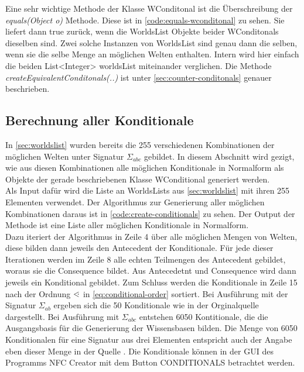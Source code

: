 \documentclass[12pt,a4paper]{article}
\newcommand\dotl{\mathrel{%
    \mathchoice{\QEQ}{\QEQ}{\QEQ}{\QEQ}%
}}
\def\QEQ{{%
    \setbox0\hbox{<}%
    \rlap{\hbox to \wd0{\hss \raisebox {0.1pt}{$\ \cdot$\hss}}}\box0
}}
\begin{document}
Eine sehr wichtige Methode der Klasse WConditonal ist die Überschreibung der \textit{equals(Object o)} Methode. Diese ist in \autoref{code:equals-wconditonal} zu sehen. Sie liefert dann true zurück, wenn die WorldsList Objekte beider WConditonals dieselben sind. Zwei solche Instanzen von WorldsList sind genau dann die selben, wenn sie die selbe Menge an möglichen Welten enthalten. Intern wird hier einfach die beiden List<Integer> worldsList miteinander verglichen. Die Methode \textit{createEquivalentConditonals(..)} ist unter \autoref{sec:counter-conditonals} genauer beschrieben.


\subsection{Berechnung aller Konditionale}




In \autoref{sec:worldslist} wurden bereits die 255 verschiedenen Kombinationen der möglichen Welten unter Signatur $\Sigma_{abc}$ gebildet. In diesem Abschnitt wird gezigt, wie aus diesen Kombinationen alle möglichen Konditionale in Normalform als Objekte der gerade beschriebenen Klasse WConditional generiert werden. \\
Als Input dafür wird die Liste an WorldsLists aus \autoref{sec:worldslist} mit ihren 255 Elementen verwendet. Der Algorithmus zur Generierung aller möglichen Kombinationen daraus ist in \autoref{code:create-conditionals} zu sehen. Der Output der Methode ist eine Liste aller möglichen Konditionale in Normalform. \\
Dazu iteriert der Algorithmus in Zeile 4 über alle möglichen Mengen von Welten, diese bilden dann jeweils den Antecedent der Konditionale. Für jede dieser Iterationen werden im Zeile 8 alle echten Teilmengen des Antecedent gebildet, woraus sie die Consequence bildet. Aus Antecedetnt und Consequence wird dann jeweils ein Konditional gebildet. Zum Schluss werden die Konditionale in Zeile 15 nach der Ordnung $\dotl$ in \autoref{eq:conditional-order} sortiert. Bei Ausführung mit der Signatur $\Sigma_{ab}$ ergeben sich die 50 Konditionale wie in der Orginalquelle \cite{beierle19} dargestellt. Bei Ausführung mit $\Sigma_{abc}$ entstehen 6050 Kontitionale, die die Ausgangsbasis für die Generierung der Wissensbasen bilden. Die Menge von 6050 Konditionalen für eine Signatur aus drei Elementen entspricht auch der Angabe eben dieser Menge in  der Quelle \cite{beierle19b}. Die Konditionale können in der GUI des Programms NFC Creator mit dem Button CONDITIONALS betrachtet werden.
\end{document}
